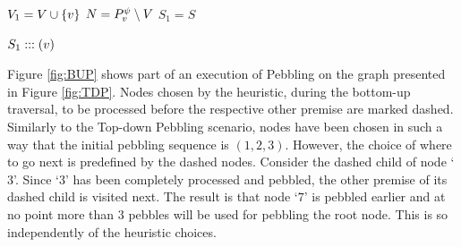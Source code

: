\documentclass{llncs}
\newcommand{\nodedistance}{0.55cm}
\begin{document}
\begin{algorithm}[h]
	
	$V_1 = V \cup \{v\}$\;
	$N = P_{v}^{\psi} \setminus V$\;
	$S_1 = S$
	
	
	\Return $S_1 ::: (v)$\;
	
  \caption[.]{}
  \label{algo:visit}
\end{algorithm}

\begin{example}
Figure \ref{fig:BUP} shows part of an execution of  Pebbling on the graph presented in Figure \ref{fig:TDP}.
Nodes chosen by the heuristic, during the bottom-up traversal, to be processed before the respective other premise are marked dashed. Similarly to the Top-down Pebbling scenario, nodes have been chosen in such a way that the initial pebbling sequence is $(1,2,3)$.
However, the choice of where to go next is predefined by the dashed nodes. Consider the dashed child of node `$3$'. Since `$3$' has been completely processed and pebbled, the other premise of its dashed child is visited next. The result is that node `$7$' is pebbled earlier and at no point more than 3 pebbles will be used for pebbling the root node. This is so independently of the heuristic choices.


\end{example}
\end{document}
